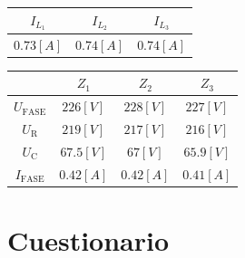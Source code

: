 \documentclass[letter,11pt]{article}
\begin{document}
\begin{center}
    \begin{tabular}{|c|c|c|}
    \hline
    $I_{L_1}$ & $I_{L_2}$ & $I_{L_3}$
    \tabularnewline \hline \hline
    $0.73[A]$ & $0.74[A]$ & $0.74[A]$
    \tabularnewline \hline
    \end{tabular}
\end{center}

\begin{center}
    \begin{tabular}{|c||c|c|c|}
    \hline
    & $Z_{1}$ & $Z_{2}$ & $Z_{3}$
    \tabularnewline \hline \hline
    $U_{\text{FASE}}$ & $226[V]$ & $228[V]$ & $227[V]$
    \tabularnewline \hline
    $U_{\text{R}}$ & $219[V]$ & $217[V]$ & $216[V]$
    \tabularnewline \hline
    $U_{\text{C}}$ & $67.5[V]$ & $67[V]$ & $65.9[V]$
    \tabularnewline \hline
    $I_{\text{FASE}}$ & $0.42[A]$ & $0.42[A]$ & $0.41[A]$
    \tabularnewline \hline
    \end{tabular}
\end{center}

\section{Cuestionario}
\end{document}
